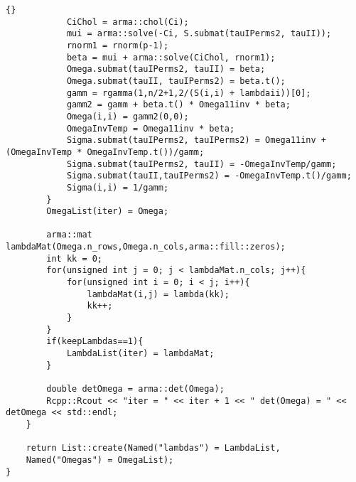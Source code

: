 \begin{lstlisting}{}
			CiChol = arma::chol(Ci);
			mui = arma::solve(-Ci, S.submat(tauIPerms2, tauII));
			rnorm1 = rnorm(p-1);
			beta = mui + arma::solve(CiChol, rnorm1);
			Omega.submat(tauIPerms2, tauII) = beta;
			Omega.submat(tauII, tauIPerms2) = beta.t();
			gamm = rgamma(1,n/2+1,2/(S(i,i) + lambdaii))[0];
			gamm2 = gamm + beta.t() * Omega11inv * beta;
			Omega(i,i) = gamm2(0,0);
			OmegaInvTemp = Omega11inv * beta;
			Sigma.submat(tauIPerms2, tauIPerms2) = Omega11inv + (OmegaInvTemp * OmegaInvTemp.t())/gamm;
			Sigma.submat(tauIPerms2, tauII) = -OmegaInvTemp/gamm;
			Sigma.submat(tauII,tauIPerms2) = -OmegaInvTemp.t()/gamm;
			Sigma(i,i) = 1/gamm;
		}
		OmegaList(iter) = Omega;
		
		arma::mat lambdaMat(Omega.n_rows,Omega.n_cols,arma::fill::zeros);
		int kk = 0;
		for(unsigned int j = 0; j < lambdaMat.n_cols; j++){
			for(unsigned int i = 0; i < j; i++){
				lambdaMat(i,j) = lambda(kk);
				kk++;
			}
		}
		if(keepLambdas==1){
			LambdaList(iter) = lambdaMat;
		}
		
		double detOmega = arma::det(Omega);
		Rcpp::Rcout << "iter = " << iter + 1 << " det(Omega) = " << detOmega << std::endl;
	}
	
	return List::create(Named("lambdas") = LambdaList,
	Named("Omegas") = OmegaList);
}
\end{lstlisting}